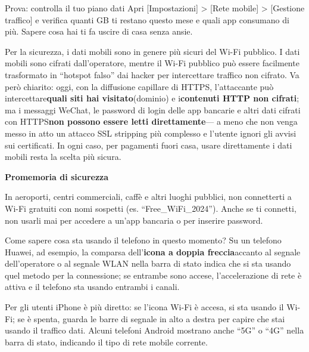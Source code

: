 \begin{tcbpractice}{Prova: controlla il tuo piano dati}
Apri [Impostazioni] > [Rete mobile] > [Gestione traffico] e verifica quanti GB ti restano questo mese e quali app consumano di più. Sapere cosa hai ti fa uscire di casa senza ansie.

\end{tcbpractice}


Per la sicurezza, i dati mobili sono in genere più sicuri del Wi-Fi pubblico. I dati mobili sono cifrati dall'operatore, mentre il Wi-Fi pubblico può essere facilmente trasformato in “hotspot falso” dai hacker per intercettare traffico non cifrato. Va però chiarito: oggi, con la diffusione capillare di HTTPS, l'attaccante può intercettare\textbf{quali siti hai visitato}(dominio) e i\textbf{contenuti HTTP non cifrati}; ma i messaggi WeChat, le password di login delle app bancarie e altri dati cifrati con HTTPS\textbf{non possono essere letti direttamente}— a meno che non venga messo in atto un attacco SSL stripping più complesso e l'utente ignori gli avvisi sui certificati. In ogni caso, per pagamenti fuori casa, usare direttamente i dati mobili resta la scelta più sicura.

\textbf{Promemoria di sicurezza}\par

In aeroporti, centri commerciali, caffè e altri luoghi pubblici, non connetterti a Wi-Fi gratuiti con nomi sospetti (es. “Free\_WiFi\_2024”). Anche se ti connetti, non usarli mai per accedere a un'app bancaria o per inserire password.


Come sapere cosa sta usando il telefono in questo momento? Su un telefono Huawei, ad esempio, la comparsa dell'\textbf{icona a doppia freccia}accanto al segnale dell'operatore o al segnale WLAN nella barra di stato indica che si sta usando quel metodo per la connessione; se entrambe sono accese, l'accelerazione di rete è attiva e il telefono sta usando entrambi i canali.

Per gli utenti iPhone è più diretto: se l'icona Wi-Fi è accesa, si sta usando il Wi-Fi; se è spenta, guarda le barre di segnale in alto a destra per capire che stai usando il traffico dati. Alcuni telefoni Android mostrano anche “5G” o “4G” nella barra di stato, indicando il tipo di rete mobile corrente.


